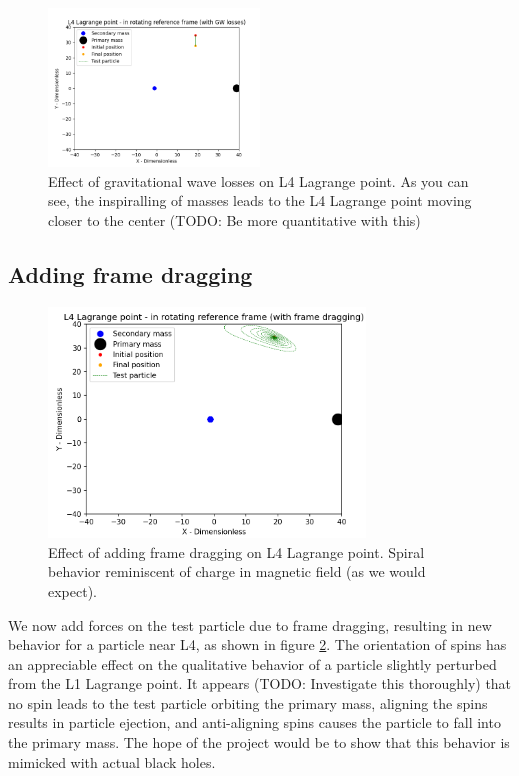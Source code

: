 \documentclass{article}
\begin{document}
\begin{figure}
    \centering
    \includegraphics[width=0.5\textwidth]{images/L4 Lagrange point with GW losses.png}
    \caption{Effect of gravitational wave losses on L4 Lagrange point. As you can see, the inspiralling of masses leads to the L4 Lagrange point moving closer to the center (TODO: Be more quantitative with this)}
    \label{fig:L4 with GW losses}
\end{figure}

\subsection{Adding frame dragging}



\begin{figure}
    \centering
    \includegraphics[width=0.75\textwidth]{images/L4 Lagrange point with frame dragging.png}
    \caption{Effect of adding frame dragging on L4 Lagrange point. Spiral behavior reminiscent of charge in magnetic field (as we would expect).}
    \label{fig:L4 with frame draggingl}
\end{figure}

We now add forces on the test particle due to frame dragging, resulting in new behavior for a particle near L4, as shown in figure \ref{fig:L4 with frame draggingl}. The orientation of spins has an appreciable effect on the qualitative behavior of a particle slightly perturbed from the L1 Lagrange point. It appears (TODO: Investigate this thoroughly) that no spin leads to the test particle orbiting the primary mass, aligning the  spins results in particle ejection, and anti-aligning spins causes the particle to fall into the primary mass. The hope of the project would be to show that this behavior is mimicked with actual black holes.
\end{document}
